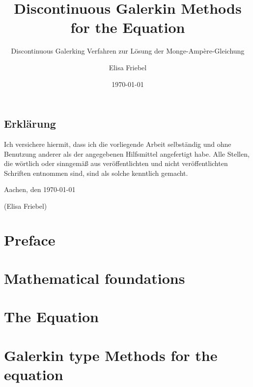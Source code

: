 \documentclass{template}
\title{Discontinuous Galerkin Methods for the \MA Equation}
\subtitle{\Large Discontinuous Galerking Verfahren zur Lösung der Monge-Amp\`ere-Gleichung}
\author{Elisa Friebel} %
\date{\today}
\begin{document}
\maketitle

\begin{center}
\begin{minipage}[t]{0.8\textwidth}

\chapter*{Erklärung}
Ich versichere hiermit, dass ich die vorliegende Arbeit selbständig und
ohne Benutzung anderer als der angegebenen Hilfsmittel angefertigt habe.
Alle Stellen, die wörtlich oder sinngemäß aus veröffentlichten und nicht
veröffentlichten Schriften entnommen sind, sind als solche kenntlich
gemacht.

\vspace{1cm}
Aachen, den \today

\vspace{2cm}
(Elisa Friebel)
\end{minipage}
\end{center}
\thispagestyle{empty}
\cleardoublepage

\tableofcontents{}

\setcounter{page}{1}


\chapter*{Preface}
\label{ch:preface}


\chapter{Mathematical foundations}
\label{ch:TheoreticalBackground}



\chapter{The \MA Equation}
\label{ch:MongeAmpereEq}



\chapter{Galerkin type Methods for the \MA equation}
\label{ch:DGMongeAmpere}

\end{document}
